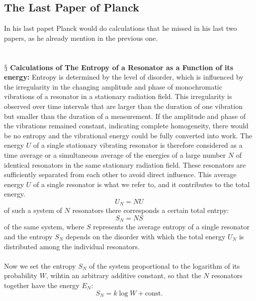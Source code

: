 \documentclass[9pt,a4paper, twocolumn]{article}
\newcommand{\newpoint}[1]{\ \\ \indent$\mathsection$ \textbf{#1}}
\begin{document}
        \subsection{The Last Paper of Planck}
            In his last papet Planck would do calculations that he missed in his last two papers, as he already mention in the previous one.
            \\
            \\
            \newpoint{Calculations of The Entropy of a Resonator as a Function of its energy:} Entropy is determined by the level of disorder, which is influenced by the irregularity in the changing amplitude and phase of monochromatic vibrations of a resonator in a stationary radiation field. This irregularity is observed over time intervals that are larger than the duration of one vibration but smaller than the duration of a measurement. If the amplitude and phase of the vibrations remained constant, indicating complete homogeneity, there would be no entropy and the vibrational energy could be fully converted into work. The energy $U$ of a single stationary vibrating resonator is therefore considered as a time average or a simultaneous average of the energies of a large number $N$ of identical resonators in the same stationary radiation field. These resonators are sufficiently separated from each other to avoid direct influence. This average energy $U$ of a single resonator is what we refer to, and it contributes to the total energy.
            \begin{equation}
                U_N = NU
            \end{equation}
            of such a system of $N$ resonators there corresponds a certain total entrpy:
            \begin{equation}
                S_N = NS
            \end{equation}
            of the same system, where $S$ represents the average entropy of a single resonator and the entropy $S_N$ depends on the disorder with which the total energy $U_N$ is distributed among the individual resonators.
            \\
            \\
            Now we set the entropy $S_N$ of the system proportional to the logarithm of its probability $W$, wihtin an arbitrary additive constant, so that the $N$ resonators together have the energy $E_N$:
            \begin{equation}
                S_N = k\log W+\text{const.}
            \end{equation}
\end{document}
